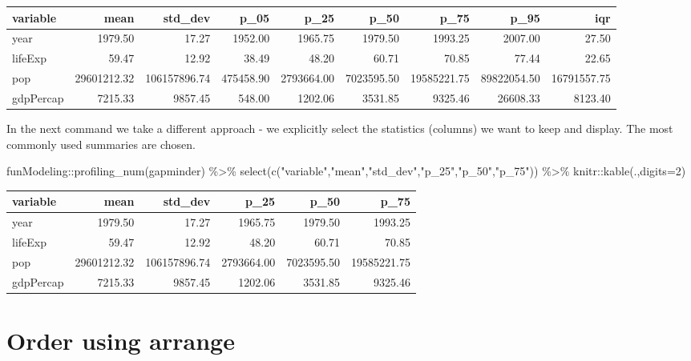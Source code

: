 \documentclass[
]{book}
\newenvironment{Shaded}{\begin{snugshade}}{\end{snugshade}}
\newcommand{\AttributeTok}[1]{\textcolor[rgb]{0.77,0.63,0.00}{#1}}
\newcommand{\DecValTok}[1]{\textcolor[rgb]{0.00,0.00,0.81}{#1}}
\newcommand{\FunctionTok}[1]{\textcolor[rgb]{0.00,0.00,0.00}{#1}}
\newcommand{\NormalTok}[1]{#1}
\newcommand{\SpecialCharTok}[1]{\textcolor[rgb]{0.00,0.00,0.00}{#1}}
\newcommand{\StringTok}[1]{\textcolor[rgb]{0.31,0.60,0.02}{#1}}
\begin{document}
\begin{tabular}{l|r|r|r|r|r|r|r|r}
\hline
variable & mean & std\_dev & p\_05 & p\_25 & p\_50 & p\_75 & p\_95 & iqr\\
\hline
year & 1979.50 & 17.27 & 1952.00 & 1965.75 & 1979.50 & 1993.25 & 2007.00 & 27.50\\
\hline
lifeExp & 59.47 & 12.92 & 38.49 & 48.20 & 60.71 & 70.85 & 77.44 & 22.65\\
\hline
pop & 29601212.32 & 106157896.74 & 475458.90 & 2793664.00 & 7023595.50 & 19585221.75 & 89822054.50 & 16791557.75\\
\hline
gdpPercap & 7215.33 & 9857.45 & 548.00 & 1202.06 & 3531.85 & 9325.46 & 26608.33 & 8123.40\\
\hline
\end{tabular}

In the next command we take a different approach - we explicitly select the statistics (columns) we want to keep and display. The most commonly used summaries are chosen.

\begin{Shaded}
\begin{Highlighting}[]
\NormalTok{funModeling}\SpecialCharTok{::}\FunctionTok{profiling\_num}\NormalTok{(gapminder) }\SpecialCharTok{\%\textgreater{}\%}
  \FunctionTok{select}\NormalTok{(}\FunctionTok{c}\NormalTok{(}\StringTok{"variable"}\NormalTok{,}\StringTok{"mean"}\NormalTok{,}\StringTok{"std\_dev"}\NormalTok{,}\StringTok{"p\_25"}\NormalTok{,}\StringTok{"p\_50"}\NormalTok{,}\StringTok{"p\_75"}\NormalTok{)) }\SpecialCharTok{\%\textgreater{}\%}
\NormalTok{  knitr}\SpecialCharTok{::}\FunctionTok{kable}\NormalTok{(.,}\AttributeTok{digits=}\DecValTok{2}\NormalTok{)}
\end{Highlighting}
\end{Shaded}

\begin{tabular}{l|r|r|r|r|r}
\hline
variable & mean & std\_dev & p\_25 & p\_50 & p\_75\\
\hline
year & 1979.50 & 17.27 & 1965.75 & 1979.50 & 1993.25\\
\hline
lifeExp & 59.47 & 12.92 & 48.20 & 60.71 & 70.85\\
\hline
pop & 29601212.32 & 106157896.74 & 2793664.00 & 7023595.50 & 19585221.75\\
\hline
gdpPercap & 7215.33 & 9857.45 & 1202.06 & 3531.85 & 9325.46\\
\hline
\end{tabular}

\hypertarget{order-using-arrange}{%
\section{Order using arrange}\label{order-using-arrange}}
\end{document}
